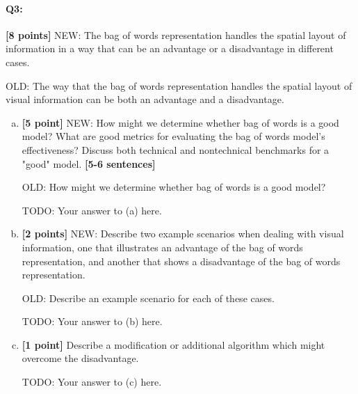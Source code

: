 







\pagebreak
\paragraph{Q3:} \textbf{[8 points]} 
NEW: The bag of words representation handles the spatial layout of information in a way that can be an advantage or a disadvantage in different cases.

OLD: The way that the bag of words representation handles the spatial layout of visual information can be both an advantage and a disadvantage.
\begin{enumerate}[(a)]

\item \textbf{[5 point]} NEW: How might we determine whether bag of words is a good model? What are good metrics for evaluating the bag of words model's effectiveness? Discuss both technical and nontechnical benchmarks for a "good" model. \textbf{[5-6 sentences]}

OLD: How might we determine whether bag of words is a good model?
\begin{mdframed}
TODO: Your answer to (a) here.
\end{mdframed}

\item \textbf{[2 points]} 
NEW: Describe two example scenarios when dealing with visual information, one that illustrates an advantage of the bag of words representation, and another that shows a disadvantage of the bag of words representation.

OLD: Describe an example scenario for each of these cases.
\begin{mdframed}
TODO: Your answer to (b) here.
\end{mdframed}

\item \textbf{[1 point]} Describe a modification or additional algorithm which might overcome the disadvantage.
\begin{mdframed}
TODO: Your answer to (c) here.
\end{mdframed}


\end{enumerate}


